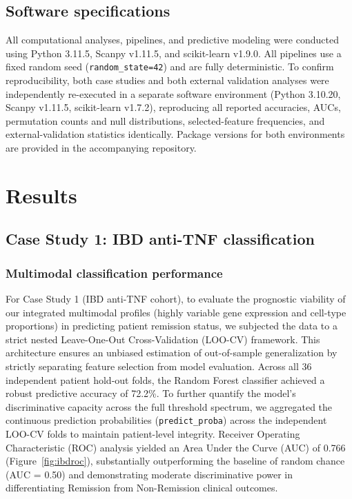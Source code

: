 \documentclass{bmcart}
\begin{document}
\subsection*{Software specifications}
All computational analyses, pipelines, and predictive modeling were conducted using Python 3.11.5, Scanpy v1.11.5, and scikit-learn v1.9.0. All pipelines use a fixed random seed (\texttt{random\_state=42}) and are fully deterministic. To confirm reproducibility, both case studies and both external validation analyses were independently re-executed in a separate software environment (Python 3.10.20, Scanpy v1.11.5, scikit-learn v1.7.2), reproducing all reported accuracies, AUCs, permutation counts and null distributions, selected-feature frequencies, and external-validation statistics identically. Package versions for both environments are provided in the accompanying repository.

\section*{Results}

\subsection*{Case Study 1: IBD anti-TNF classification}

\subsubsection*{Multimodal classification performance}
For Case Study 1 (IBD anti-TNF cohort), to evaluate the prognostic viability of our integrated multimodal profiles (highly variable gene expression and cell-type proportions) in predicting patient remission status, we subjected the data to a strict nested Leave-One-Out Cross-Validation (LOO-CV) framework. This architecture ensures an unbiased estimation of out-of-sample generalization by strictly separating feature selection from model evaluation. Across all 36 independent patient hold-out folds, the Random Forest classifier achieved a robust predictive accuracy of 72.2\%. To further quantify the model's discriminative capacity across the full threshold spectrum, we aggregated the continuous prediction probabilities (\texttt{predict\_proba}) across the independent LOO-CV folds to maintain patient-level integrity. Receiver Operating Characteristic (ROC) analysis yielded an Area Under the Curve (AUC) of 0.766 (Figure~\ref{fig:ibdroc}), substantially outperforming the baseline of random chance (AUC = 0.50) and demonstrating moderate discriminative power in differentiating Remission from Non-Remission clinical outcomes.
\end{document}
